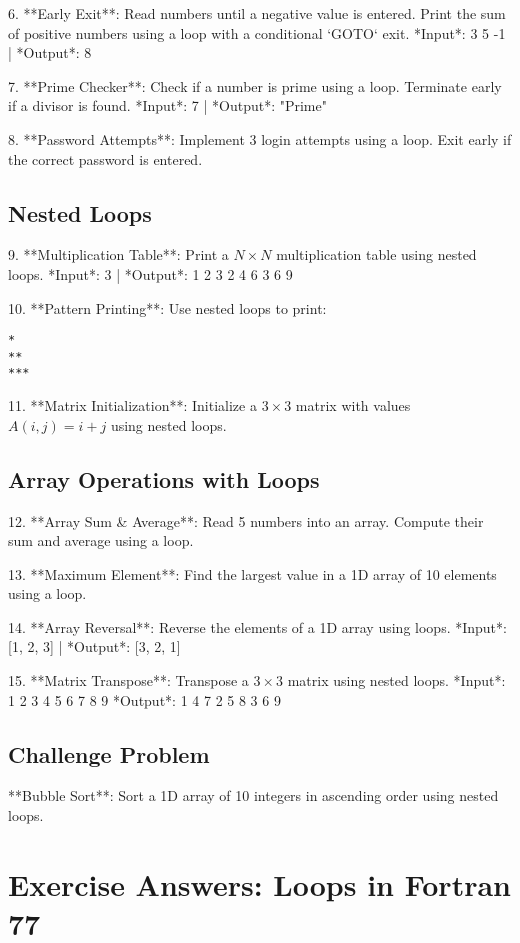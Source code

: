 \documentclass{book}
\begin{document}
6. **Early Exit**:  
Read numbers until a negative value is entered. Print the sum of positive numbers using a loop with a conditional `GOTO` exit.  
*Input*: 3 5 -1 | *Output*: 8  

7. **Prime Checker**:  
Check if a number is prime using a loop. Terminate early if a divisor is found.  
*Input*: 7 | *Output*: "Prime"  

8. **Password Attempts**:  
Implement 3 login attempts using a loop. Exit early if the correct password is entered.  

\subsection*{Nested Loops}  
9. **Multiplication Table**:  
Print a \( N \times N \) multiplication table using nested loops.  
*Input*: 3 | *Output*:  
1 2 3  
2 4 6  
3 6 9  

10. **Pattern Printing**:  
Use nested loops to print:  
\begin{verbatim}
*
**
***
\end{verbatim}  

11. **Matrix Initialization**:  
Initialize a \( 3 \times 3 \) matrix with values \( A(i,j) = i + j \) using nested loops.  

\subsection*{Array Operations with Loops}  
12. **Array Sum \& Average**:  
Read 5 numbers into an array. Compute their sum and average using a loop.  

13. **Maximum Element**:  
Find the largest value in a 1D array of 10 elements using a loop.  

14. **Array Reversal**:  
Reverse the elements of a 1D array using loops.  
*Input*: [1, 2, 3] | *Output*: [3, 2, 1]  

15. **Matrix Transpose**:  
Transpose a \( 3 \times 3 \) matrix using nested loops.  
*Input*:  
1 2 3  
4 5 6  
7 8 9  
*Output*:  
1 4 7  
2 5 8  
3 6 9  

\subsection*{Challenge Problem}  
**Bubble Sort**: Sort a 1D array of 10 integers in ascending order using nested loops.  

\section{Exercise Answers: Loops in Fortran 77}
\end{document}
